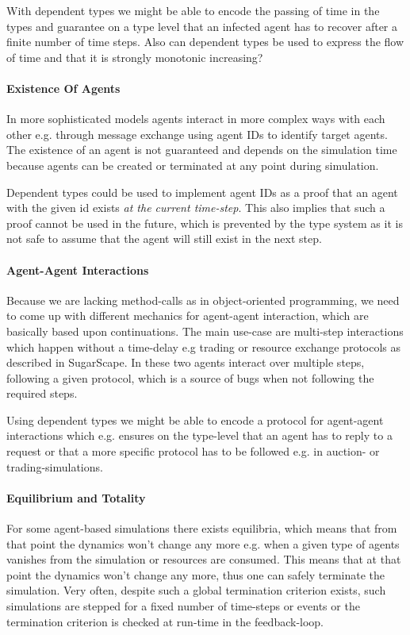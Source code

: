 With dependent types we might be able to encode the passing of time in the types and guarantee on a type level that an infected agent has to recover after a finite number of time steps. Also can dependent types be used to express the flow of time and that it is strongly monotonic increasing?
	
\paragraph{Existence Of Agents}
In more sophisticated models agents interact in more complex ways with each other e.g. through message exchange using agent IDs to identify target agents. The existence of an agent is not guaranteed and depends on the simulation time because agents can be created or terminated at any point during simulation. 

Dependent types could be used to implement agent IDs as a proof that an agent with the given id exists \textit{at the current time-step}. This also implies that such a proof cannot be used in the future, which is prevented by the type system as it is not safe to assume that the agent will still exist in the next step. %

\paragraph{Agent-Agent Interactions}
Because we are lacking method-calls as in object-oriented programming, we need to come up with different mechanics for agent-agent interaction, which are basically based upon continuations. The main use-case are multi-step interactions which happen without a time-delay e.g trading or resource exchange protocols as described in SugarScape. In these two agents interact over multiple steps, following a given protocol, which is a source of bugs when not following the required steps.

Using dependent types we might be able to encode a protocol for agent-agent interactions which e.g. ensures on the type-level that an agent has to reply to a request or that a more specific protocol has to be followed e.g. in auction- or trading-simulations.

\paragraph{Equilibrium and Totality}
For some agent-based simulations there exists equilibria, which means that from that point the dynamics won't change any more e.g. when a given type of agents vanishes from the simulation or resources are consumed. This means that at that point the dynamics won't change any more, thus one can safely terminate the simulation. Very often, despite such a global termination criterion exists, such simulations are stepped for a fixed number of time-steps or events or the termination criterion is checked at run-time in the feedback-loop. 
	
